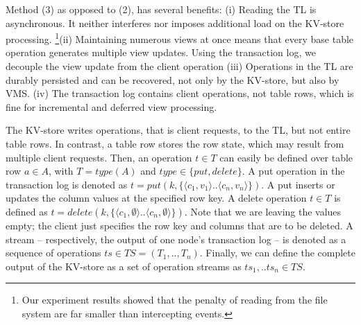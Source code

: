 Method (3) as opposed to (2), has several benefits: (i) Reading the TL 
is asynchronous. It neither interferes nor imposes additional load on the 
KV-store processing. \footnote{Our experiment results showed that the 
penalty of reading from the file system 
are far smaller than intercepting events.}(ii) Maintaining numerous views at once means 
that every base table operation generates multiple view updates. Using the
transaction log, we decouple the view update from the client operation  
 (iii) Operations in the TL are durably persisted and can be recovered, 
 not only by the KV-store, but also by VMS. (iv) The transaction log contains
 client operations, not table rows, which is fine for incremental and 
 deferred view processing.

The KV-store writes operations, that is client requests, to the TL,
but not entire table rows.  In contrast, a table row stores the row
state, which may result from multiple client requests.  Then, an 
operation $t \in T$ can easily be defined over table row $a \in A$,
with $T = type(A)$  and $type \in \{put, delete\}$. A put operation in
the transaction log is denoted as $t=put (k, \{\langle c_1,v_1\rangle..\langle
c_n,v_n\rangle\})$. A put inserts or updates the column values at the
specified row key. A delete operation $t \in T$ is defined as
$t=delete (k, \{\langle c_1,\emptyset\rangle..\langle
c_n,\emptyset\rangle\})$.  Note that we are leaving the values 
empty; the client just specifies the row key and columns that are to
be deleted. A stream -- respectively, the output of one node's transaction log --
is denoted as a sequence of operations $ts \in TS=(T_1,..,T_n)$. Finally, we can
define the complete output of the KV-store as a set of operation 
streams as $ts_1,..ts_n \in TS$. 


%
%
